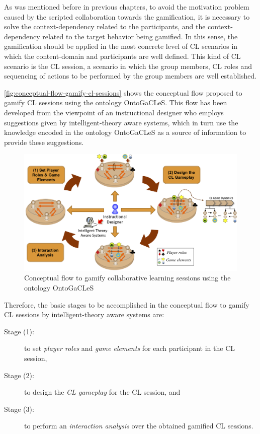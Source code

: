 As was mentioned before in previous chapters, to avoid the motivation problem caused by the scripted collaboration towards the gamification, it is necessary to solve the context-dependency related to the participants, and the context-dependency related to the target behavior being gamified.
In this sense, the gamification should be applied in the most concrete level of CL scenarios in which the content-domain and participants are well defined.
This kind of CL scenario is the CL session, a scenario in which the group members, CL roles and sequencing of actions to be performed by the group members are well established.

\autoref{fig:conceptual-flow-gamify-cl-sessions} shows the conceptual flow proposed to gamify CL sessions using the ontology OntoGaCLeS.
This flow has been developed from the viewpoint of an instructional designer who employs suggestions given by intelligent-theory aware systems, which in turn use the knowledge encoded in the ontology OntoGaCLeS as a source of information to provide these suggestions.

\begin{figure}[htb]
  \caption{Conceptual flow to gamify collaborative learning sessions using the ontology OntoGaCLeS}
  \label{fig:conceptual-flow-gamify-cl-sessions}
  \centering
  \includegraphics[width=1\textwidth]{images/chap-mechanisms-procedures/conceptual-flow-gamify-cl-sessions.png}
  \fautor
\end{figure}

Therefore, the basic stages to be accomplished in the conceptual flow to gamify CL sessions by intelligent-theory aware systems are:

\begin{description}
\item[Stage (1):] to set \emph{player roles} and \emph{game elements} for each participant in the CL session,
\item[Stage (2):] to design the \emph{CL gameplay} for the CL session, and
\item[Stage (3):] to perform an \emph{interaction analysis} over the obtained gamified CL sessions.
\end{description}

